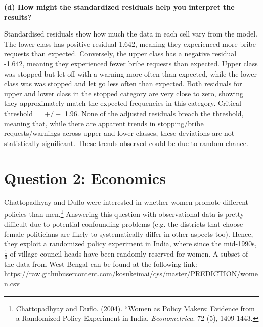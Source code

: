 \documentclass[12pt,letterpaper]{article}
\begin{document}
\begin{enumerate}
	
	\vspace{0cm}
	\textbf{(d) How might the standardized residuals help you interpret the results?}  
	
	Standardised residuals show how much the data in each cell vary from the model. The lower class has positive residual 1.642, meaning they experienced more bribe requests than expected. Conversely, the upper class has a negative residual -1.642, meaning they experienced fewer bribe requests than expected. Upper class was stopped but let off with a warning more often than expected, while the lower class was was stopped and let go less often than expected. Both residuals for upper and lower class in the stopped category are very close to zero, showing they approximately match the expected frequencies in this category. Critical threshold $= +/- $ 1.96. None of the adjusted residuals breach the threshold, meaning that, while there are apparent trends in stopping/bribe requests/warnings across upper and lower classes, these deviations are not statistically significant. These trends observed could be due to random chance.
	
\end{enumerate}
\newpage

\section*{Question 2: Economics}
Chattopadhyay and Duflo were interested in whether women promote different policies than men.\footnote{Chattopadhyay and Duflo. (2004). ``Women as Policy Makers: Evidence from a Randomized Policy Experiment in India. \textit{Econometrica}. 72 (5), 1409-1443.} Answering this question with observational data is pretty difficult due to potential confounding problems (e.g. the districts that choose female politicians are likely to systematically differ in other aspects too). Hence, they exploit a randomized policy experiment in India, where since the mid-1990s, $\frac{1}{3}$ of village council heads have been randomly reserved for women. A subset of the data from West Bengal can be found at the following link: \url{https://raw.githubusercontent.com/kosukeimai/qss/master/PREDICTION/women.csv}\\
\end{document}
